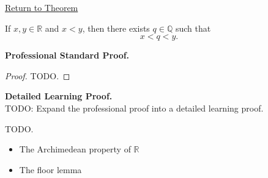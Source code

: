 \newpage
{}
\label{prf:q-dense-in-r}

\begin{remark*}[Return]
\hyperref[thm:q-dense-in-r]{Return to Theorem}
\end{remark*}

\begin{theorem*}
If $x,y\in\mathbb{R}$ and $x<y$, then there exists $q\in\mathbb{Q}$ such that
\[
x<q<y.
\]
\end{theorem*}

\textbf{Professional Standard Proof.}~\\
\begin{proof}
TODO.
\end{proof}

\textbf{Detailed Learning Proof.}~\\
TODO: Expand the professional proof into a detailed learning proof.


\begin{remark*}
TODO.
\end{remark*}

\begin{dependencies}
\begin{itemize}
  \item The Archimedean property of $\mathbb{R}$
  \item The floor lemma
\end{itemize}
\end{dependencies}
